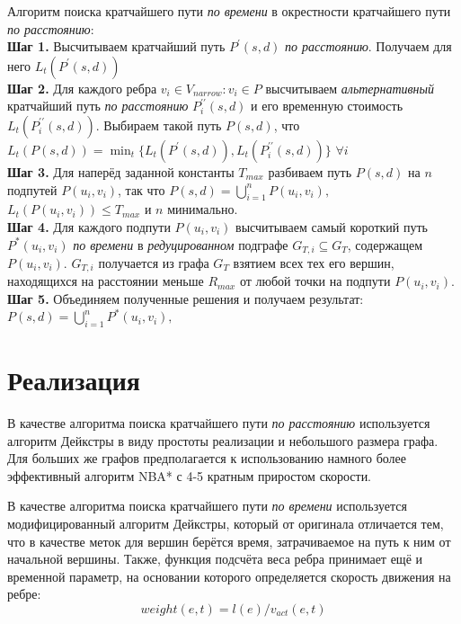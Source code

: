 \documentclass[12pt]{article}
\begin{document}
Алгоритм поиска кратчайшего пути \textit{по времени} в окрестности кратчайшего пути \textit{по расстоянию}: \\
\textbf{Шаг 1.} Высчитываем кратчайший путь $P^\prime(s,d)$ \textit{по расстоянию}. Получаем для него $L_t(P^\prime(s,d))$\\
\textbf{Шаг 2.} Для каждого ребра $v_i \in V_{narrow}: v_i \in P$ высчитываем \textit{альтернативный} кратчайший путь \textit{по расстоянию} $P_i^{\prime\prime}(s,d)$ и его временную стоимость $L_t(P_i^{\prime\prime}(s,d))$. Выбираем такой путь $P(s,d)$, что $L_t(P(s,d)) = \min_t\{L_t(P^\prime(s,d)), L_t(P_i^{\prime\prime}(s,d))\}$ $ \forall i$ \\
\textbf{Шаг 3.} Для наперёд заданной константы $T_{max}$ разбиваем путь $P(s,d)$ на $n$ подпутей $P(u_i,v_i)$, так что $P(s,d) = \bigcup\limits_{i=1}^{n}P(u_i,v_i),$  $L_t(P(u_i,v_i)) \leq T_{max}$ и $n$ минимально. \\
\textbf{Шаг 4.} Для каждого подпути $P(u_i,v_i)$ высчитываем самый короткий путь $P^*(u_i,v_i)$ \textit{по времени} в \textit{редуцированном} подграфе $G_{T,i} \subseteq   G_T$, содержащем $P(u_i,v_i)$. $G_{T,i}$ получается из графа $G_T$ взятием всех тех его вершин, находящихся на расстоянии меньше $R_{max}$ от любой точки на подпути $P(u_i,v_i)$.\\
\textbf{Шаг 5.} Объединяем полученные решения и получаем результат: $P(s,d) = \bigcup\limits_{i=1}^{n}P^*(u_i,v_i),$

\section{Реализация}

В качестве алгоритма поиска кратчайшего пути \textit{по расстоянию} используется алгоритм Дейкстры в виду простоты реализации и небольшого размера графа. Для больших же графов предполагается к использованию намного более эффективный алгоритм NBA* \cite{nba} с 4-5 кратным приростом скорости.

В качестве алгоритма поиска кратчайшего пути \textit{по времени} используется модифицированный алгоритм Дейкстры, который от оригинала отличается тем, что в качестве меток для вершин берётся время, затрачиваемое на путь к ним от начальной вершины. Также, функция подсчёта веса ребра принимает ещё и временной параметр, на основании которого определяется скорость движения на ребре: 
$$weight(e, t) = l(e) / v_{act}(e, t)$$
\end{document}
